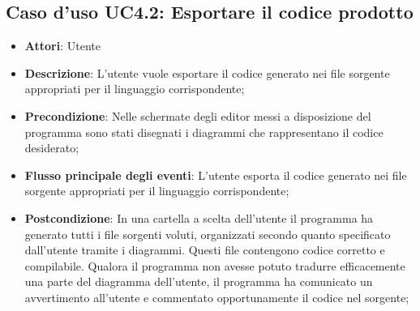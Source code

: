 \documentclass[../AnalisiDeiRequisiti.tex]{subfiles}
\begin{document}
					\subsection{Caso d'uso UC4.2: Esportare il codice prodotto}
					\begin{itemize}
						\item \textbf{Attori}: Utente
						\item \textbf{Descrizione}: L'utente vuole esportare il codice generato nei file sorgente appropriati per il linguaggio corrispondente;
						\item \textbf{Precondizione}: Nelle schermate degli editor messi a disposizione del programma sono stati disegnati i diagrammi che rappresentano il codice desiderato;
						\item \textbf{Flusso principale degli eventi}: L'utente esporta il codice generato nei file sorgente appropriati per il linguaggio corrispondente;
						\item \textbf{Postcondizione}: In una cartella a scelta dell'utente il programma ha generato tutti i file sorgenti voluti, organizzati secondo quanto specificato dall'utente tramite i diagrammi. Questi file contengono codice corretto e compilabile. Qualora il programma non avesse potuto tradurre efficacemente una parte del diagramma dell'utente, il programma ha comunicato un avvertimento all'utente e commentato opportunamente il codice nel sorgente;
					\end{itemize}
\end{document}
